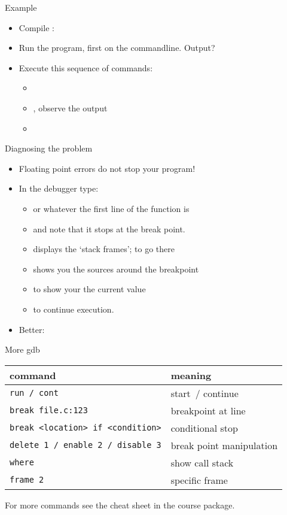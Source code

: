 \documentclass[11pt,headernav]{beamer}
\begin{document}
\begin{frame}[containsverbatim]{Example}
  \begin{itemize}
  \item
    Compile : 
  \item 
    Run the program, first on the commandline. Output?
  \item Execute this sequence of commands:
    \begin{itemize}
    \item {}
    \item {}, observe the output
    \item {}
    \end{itemize}
  \end{itemize}
\end{frame}

\begin{frame}[containsverbatim]{Diagnosing the problem}
  \begin{itemize}
  \item Floating point errors do not stop your program!
  \item In the debugger type:
    \begin{itemize}
    \item {} or whatever the first line of the
       function is
    \item {} and note that it stops at the break point.
    \item {} displays the `stack frames';  to go there
    \item {} shows you the sources around the breakpoint
    \item {} to show your the current value
    \item {} to continue execution.
    \end{itemize}
  \item Better: 
  \end{itemize}
\end{frame}

\begin{frame}{More gdb}
  \begin{tabular}{|l|l|}
    \hline
    command&meaning\\
    \hline
    \texttt{run / cont}&start~/ continue \\
    \texttt{break file.c:123}&breakpoint at line\\
    \texttt{break <location> if <condition>}&conditional stop\\
    \texttt{delete 1 / enable 2 / disable 3}&break point manipulation\\
    \texttt{where}&show call stack\\
    \texttt{frame 2}&specific frame\\
    \hline
  \end{tabular}

  For more commands see the cheat sheet in the course package.
\end{frame}
\end{document}
